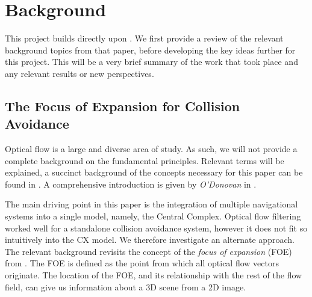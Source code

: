 \documentclass[a4paper,11pt,twoside,openright]{article}
\let\oldsection\section
\def\section{\cleardoublepage\oldsection}
\begin{document}
\section{ Background }
This project builds directly upon \cite{Mitchell2018}. We first provide a review
of the relevant background topics from that paper, before developing the key
ideas further for this project. This will be a very brief summary of the work
that took place and any relevant results or new perspectives.


\subsection{ The Focus of Expansion for Collision Avoidance } \label{OFBackground}
Optical flow is a large and diverse area of study. As such, we will
not provide a complete background on the fundamental
principles. Relevant terms will be explained, a succinct
background of the concepts necessary for this paper can be found in
\cite{Mitchell2018}. A comprehensive introduction is given by
\textit{O'Donovan} in \cite{ODonovan2005}.
\newline
\par

The main driving point in this paper is the integration of multiple
navigational systems into a single model, namely, the Central Complex.
Optical flow filtering worked well for a standalone collision
avoidance system, however it does not fit so intuitively into the CX
model. We therefore investigate an alternate approach. The relevant
background revisits the concept of the \textit{focus of expansion}
(FOE) from \cite{Mitchell2018, ODonovan2005}.  The FOE is defined as
the point from which all optical flow vectors originate. The location
of the FOE, and its relationship with the rest of the flow field, can
give us information about a 3D scene from a 2D image.
\newline
\par
\end{document}
